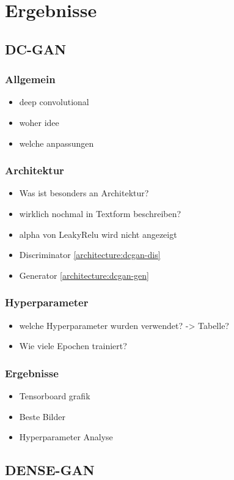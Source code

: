 
\chapter{Ergebnisse}

\section{DC-GAN}
\subsection{Allgemein}
\begin{itemize}
	\item deep convolutional
	\item woher idee
	\item welche anpassungen
\end{itemize}

\subsection{Architektur}
\begin{itemize}
	\item Was ist besonders an Architektur?
	\item wirklich nochmal in Textform beschreiben?
	\item alpha von LeakyRelu wird nicht angezeigt
	\item Discriminator \cref{architecture:dcgan-dis} 
	\item Generator \cref{architecture:dcgan-gen}
\end{itemize}

\subsection{Hyperparameter}
\begin{itemize}
	\item welche Hyperparameter wurden verwendet? -> Tabelle?
	\item Wie viele Epochen trainiert?
\end{itemize}

\subsection{Ergebnisse}
\begin{itemize}
	\item Tensorboard grafik
	\item Beste Bilder
	\item Hyperparameter Analyse
\end{itemize}

\section{DENSE-GAN}
